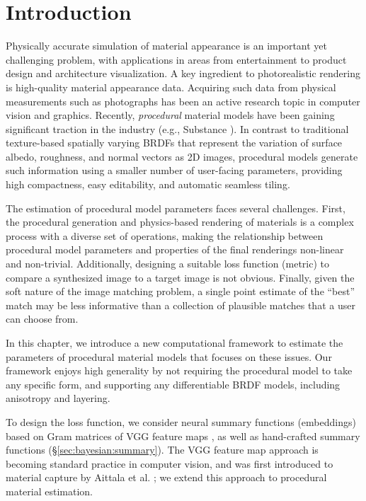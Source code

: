 \section{Introduction}
\label{sec:bayesian:intro}

Physically accurate simulation of material appearance is an important yet challenging problem, with applications in areas from entertainment to product design and architecture visualization.
A key ingredient to photorealistic rendering is high-quality material appearance data.
Acquiring such data from physical measurements such as photographs has been an active research topic in computer vision and graphics. Recently, \emph{procedural} material models have been gaining significant traction in the industry (e.g., Substance \cite{adobe2019substance}).
In contrast to traditional texture-based spatially varying BRDFs that represent the variation of surface albedo, roughness, and normal vectors as 2D images, procedural models generate such information using a smaller number of user-facing parameters, providing high compactness, easy editability, and automatic seamless tiling.

The estimation of procedural model parameters faces several challenges. First, the procedural generation and physics-based rendering of materials is a complex process with a diverse set of operations, making the relationship between procedural model parameters and properties of the final renderings non-linear and non-trivial.
Additionally, designing a suitable loss function (metric) to compare a synthesized image to a target image is not obvious. Finally, given the soft nature of the image matching problem, a single point estimate of the ``best'' match may be less informative than a collection of plausible matches that a user can choose from.

In this chapter, we introduce a new computational framework to estimate the parameters of procedural material models that focuses on these issues.
Our framework enjoys high generality by not requiring the procedural model to take any specific form, and supporting any differentiable BRDF models, including anisotropy and layering.

To design the loss function, we consider neural summary functions (embeddings) based on Gram matrices of VGG feature maps \cite{gatys2015neural,gatys2016image}, as well as hand-crafted summary functions (\S\ref{sec:bayesian:summary}). The VGG feature map approach is becoming standard practice in computer vision, and was first introduced to material capture by Aittala et al. \cite{aittala2016reflectance}; we extend this approach to procedural material estimation.

